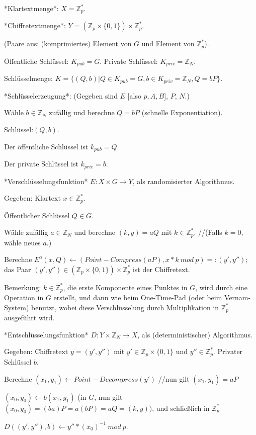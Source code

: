 \documentclass[a4paper]{article}
\begin{document}
\begin{multicols}{3}
    *Klartextmenge*: $X=\mathbb{Z}^*_p$.

    *Chiffretextmenge*: $Y=(\mathbb{Z}_p \times\{0,1\})\times\mathbb{Z}^*_p$.
    \begin{itemize*}
        \item (Paare aus: (komprimiertes) Element von $G$ und Element von $\mathbb{Z}^*_p$).
        \item Öffentliche Schlüssel: $K_{pub}=G$. Private Schlüssel: $K_{priv}=\mathbb{Z}_N$.
        \item Schlüsselmenge: $K=\{(Q,b)|Q\in K_{pub} = G,b\in K_{priv} =\mathbb{Z}_N,Q=bP\}$.
    \end{itemize*}

    *Schlüsselerzeugung*: (Gegeben sind $E$ [also $p,A,B$], $P$, $N$.)
    \begin{itemize*}
        \item Wähle $b\in\mathbb{Z}_N$ zufällig und berechne $Q=bP$ (schnelle Exponentiation).
        \item Schlüssel:$(Q,b)$.
        \item Der öffentliche Schlüssel ist $k_{pub}=Q$.
        \item Der private Schlüssel ist $k_{priv}=b$.
    \end{itemize*}

    *Verschlüsselungsfunktion* $E:X\times G\rightarrow Y$, als randomisierter Algorithmus.
    \begin{itemize*}
        \item Gegeben: Klartext $x\in\mathbb{Z}^*_p$.
        \item Öffentlicher Schlüssel $Q\in G$.
        \item Wähle zufällig $a\in\mathbb{Z}_N$ und berechne $(k,y) =aQ$ mit $k\in\mathbb{Z}^*_p$. //(Falls $k=0$, wähle neues $a$.)
        \item Berechne $E^a (x,Q)\leftarrow (Point-Compress(aP),x*k\ mod\ p) =: (y',y'');$ das Paar $(y',y'')\in(\mathbb{Z}_p\times\{0,1\})\times\mathbb{Z}^*_p$ ist der Chiffretext.
    \end{itemize*}

    Bemerkung: $k\in\mathbb{Z}^*_p$, die erste Komponente eines Punktes in $G$, wird durch eine Operation in $G$ erstellt, und dann wie beim One-Time-Pad (oder beim Vernam-System) benutzt, wobei diese Verschlüsselung durch Multiplikation in $\mathbb{Z}^*_p$ ausgeführt wird.

    *Entschlüsselungsfunktion* $D:Y\times\mathbb{Z}_N \rightarrow X$, als (deterministischer) Algorithmus.
    \begin{itemize*}
        \item Gegeben: Chiffretext $y=(y',y'')$ mit $y'\in\mathbb{Z}_p\times\{0,1\}$ und $y''\in\mathbb{Z}^*_p$. Privater Schlüssel $b$.
        \item Berechne $(x_1,y_1)\leftarrow Point-Decompress (y')$ //nun gilt $(x_1,y_1) =aP$
        \item $(x_0,y_0)\leftarrow b(x_1,y_1)$ (in $G$, nun gilt $(x_0,y_0) = (ba)P=a(bP) =aQ= (k,y))$, und schließlich in $\mathbb{Z}^*_p$
        \item $D((y',y''),b)\leftarrow y''*(x_0)^{-1}\ mod\ p$.
    \end{itemize*}


\end{multicols}
\end{document}
